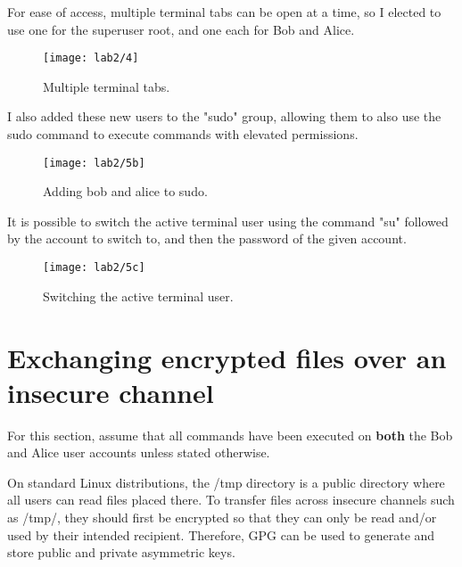 
For ease of access, multiple terminal tabs can be open at a time, so I elected to use one for the superuser root,
and one each for Bob and Alice.

\begin{figure}[H]
    \centering
    \texttt{[image: lab2/4]}
    \caption{Multiple terminal tabs.}
    \label{fig:terminalTabs}
\end{figure}

I also added these new users to the "sudo" group, allowing them to also use the sudo command to execute commands
with elevated permissions.

\begin{figure}[H]
    \centering
    \texttt{[image: lab2/5b]}
    \caption{Adding bob and alice to sudo.}
    \label{fig:sudoAdd1}
\end{figure}



It is possible to switch the active terminal user using the command "su" followed by the account to switch to,
and then the password of the given account.

\begin{figure}[H]
    \centering
    \texttt{[image: lab2/5c]}
    \caption{Switching the active terminal user.}
    \label{fig:suBobAlice}
\end{figure}

\pagebreak

\section{Exchanging encrypted files over an insecure channel}\label{sec:tmpExchange}
\begin{tcolorbox}[colback=orange!5!white,colframe=orange!75!black]
    For this section, assume that all commands have been executed on \textbf{both} the Bob and Alice
    user accounts unless stated otherwise.
\end{tcolorbox}
On standard Linux distributions, the /tmp directory is a public directory where all users can read files placed there.
To transfer files across insecure channels such as /tmp/, they should first be encrypted so that
they can only be read and/or used by their intended recipient.
Therefore, GPG can be used to generate and store public and private asymmetric keys.

